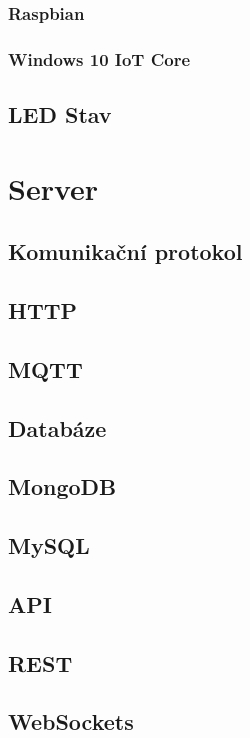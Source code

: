 \documentclass{bakalarka}
\begin{document}
			\subsubsection{Raspbian}
			
		
			\subsubsection{Windows 10 IoT Core}
			
		\subsection{LED Stav}
	
	\section{Server}
		\subsection{Komunikační protokol}
			\subsection{HTTP}
		
			\subsection{MQTT}
	
		\subsection{Databáze}
			\subsection{MongoDB}
		
			\subsection{MySQL}
	
		\subsection{API}
			\subsection{REST}
		
			\subsection{WebSockets}
		
\end{document}
